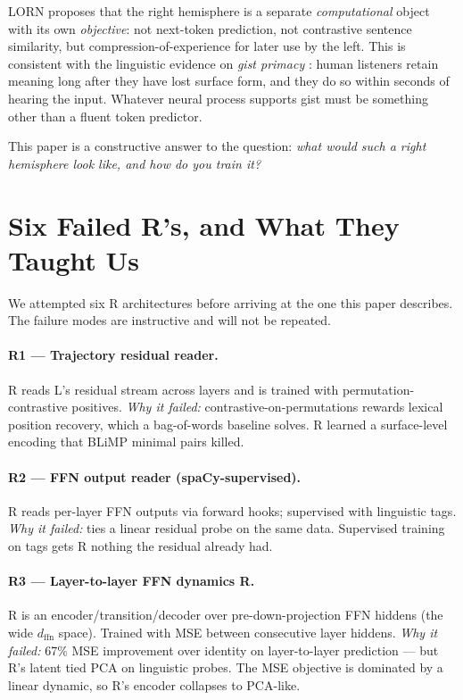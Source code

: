 \documentclass[10pt, twocolumn, a4paper]{article}
\begin{document}
LORN proposes that the right hemisphere is a separate \emph{computational} object with its own \emph{objective}: not next-token prediction, not contrastive sentence similarity, but compression-of-experience for later use by the left. This is consistent with the linguistic evidence on \emph{gist primacy} \cite{sachs1967, kintsch1988, ferreira2002, karimi-ferreira2024, reyna-brainerd2020}: human listeners retain meaning long after they have lost surface form, and they do so within seconds of hearing the input. Whatever neural process supports gist must be something other than a fluent token predictor.

This paper is a constructive answer to the question: \emph{what would such a right hemisphere look like, and how do you train it?}


\section{Six Failed R's, and What They Taught Us}
\label{sec:failures}

We attempted six R architectures before arriving at the one this paper describes. The failure modes are instructive and will not be repeated.

\paragraph{R1 --- Trajectory residual reader.} R reads L's residual stream across layers and is trained with permutation-contrastive positives. \emph{Why it failed:} contrastive-on-permutations rewards lexical position recovery, which a bag-of-words baseline solves. R learned a surface-level encoding that BLiMP minimal pairs killed.

\paragraph{R2 --- FFN output reader (spaCy-supervised).} R reads per-layer FFN outputs via forward hooks; supervised with linguistic tags. \emph{Why it failed:} ties a linear residual probe on the same data. Supervised training on tags gets R nothing the residual already had.

\paragraph{R3 --- Layer-to-layer FFN dynamics R.} R is an encoder/transition/decoder over pre-down-projection FFN hiddens (the wide $d_{\text{ffn}}$ space). Trained with MSE between consecutive layer hiddens. \emph{Why it failed:} 67\% MSE improvement over identity on layer-to-layer prediction --- but R's latent tied PCA on linguistic probes. The MSE objective is dominated by a linear dynamic, so R's encoder collapses to PCA-like.
\end{document}

